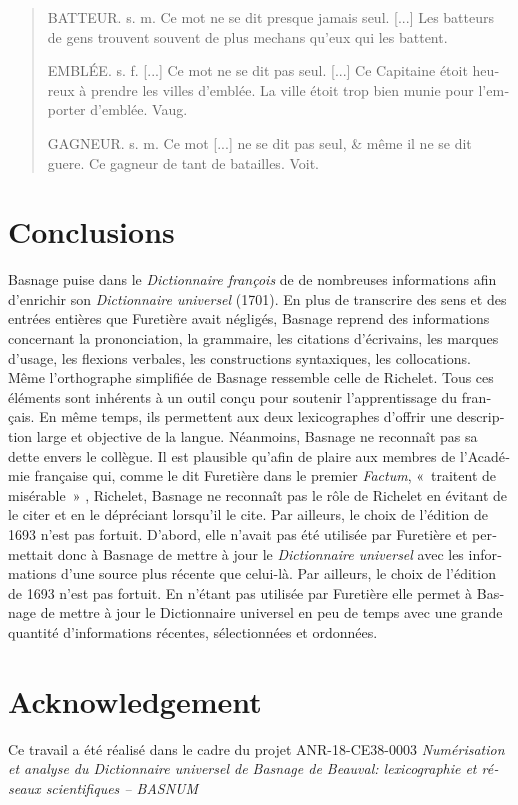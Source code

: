 \documentclass[output=paper,colorlinks,citecolor=brown,arabicfont,chinesefont,booklanguage=french]{langscibook}
\begin{document}
\begin{otherlanguage}{french}
\begin{quote}
    BATTEUR. s. m. Ce mot ne se dit presque jamais seul. [...] Les batteurs de gens trouvent souvent de plus mechans qu'eux qui les battent. 

    EMBLÉE. s. f. [...] Ce mot ne se dit pas seul. [...] Ce Capitaine étoit heureux à prendre les villes d'emblée. La ville étoit trop bien munie pour l'emporter d'emblée. Vaug. 

    GAGNEUR. s. m. Ce mot [...] ne se dit pas seul, \& même il ne se dit guere. Ce gagneur de tant de batailles. Voit.
\end{quote}

\section{Conclusions}

Basnage puise dans le \emph{Dictionnaire françois} de \citet{Richelet1693} de nombreuses informations afin d'enrichir son \emph{Dictionnaire universel} (1701). En plus de transcrire des sens et des entrées entières que Furetière avait négligés, Basnage reprend des informations concernant la prononciation, la grammaire, les citations d’écrivains, les marques d'usage, les flexions verbales, les constructions syntaxiques, les collocations. Même l’orthographe simplifiée de Basnage ressemble celle de Richelet. Tous ces éléments sont inhérents à un outil conçu pour soutenir l'apprentissage du français. En même temps, ils permettent aux deux lexicographes d'offrir une description large et objective de la langue. Néanmoins, Basnage ne reconnaît pas sa dette envers le collègue. Il est plausible qu’afin de plaire aux membres de l'Académie française qui, comme le dit Furetière dans le premier \emph{Factum}, «~traitent de misérable~» \citep[9]{Asselineau1859}, Richelet, Basnage ne reconnaît pas le rôle de Richelet en évitant de le citer et en le dépréciant lorsqu'il le cite. Par ailleurs, le choix de l'édition de 1693 n'est pas fortuit. D'abord, elle n'avait pas été utilisée par Furetière et permettait donc à Basnage de mettre à jour le \emph{Dictionnaire universel} avec les informations d’une source plus récente que celui-là. Par ailleurs, le choix de l'édition de 1693 n'est pas fortuit. En n’étant pas utilisée par Furetière elle permet à Basnage de mettre à jour le Dictionnaire universel en peu de temps avec une grande quantité d'informations récentes, sélectionnées et ordonnées.

\section*{Acknowledgement}
Ce travail a été réalisé dans le cadre du projet ANR-18-CE38-0003 \emph{Numérisation et analyse du Dictionnaire universel de Basnage de Beauval: lexicographie et réseaux scientifiques – BASNUM}

{\sloppy\printbibliography[heading=subbibliography,notkeyword=this]}
\end{otherlanguage}
\end{document}

